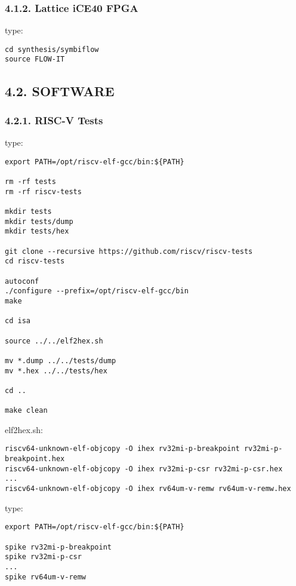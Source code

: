\documentclass[]{article}
\begin{document}
\hypertarget{lattice-ice40-fpga}{%
\subsubsection{4.1.2. Lattice iCE40 FPGA}\label{lattice-ice40-fpga}}

type:

\begin{verbatim}
cd synthesis/symbiflow
source FLOW-IT
\end{verbatim}

\hypertarget{software-1}{%
\subsection{4.2. SOFTWARE}\label{software-1}}

\hypertarget{risc-v-tests}{%
\subsubsection{4.2.1. RISC-V Tests}\label{risc-v-tests}}

type:

\begin{verbatim}
export PATH=/opt/riscv-elf-gcc/bin:${PATH}

rm -rf tests
rm -rf riscv-tests

mkdir tests
mkdir tests/dump
mkdir tests/hex

git clone --recursive https://github.com/riscv/riscv-tests
cd riscv-tests

autoconf
./configure --prefix=/opt/riscv-elf-gcc/bin
make

cd isa

source ../../elf2hex.sh

mv *.dump ../../tests/dump
mv *.hex ../../tests/hex

cd ..

make clean
\end{verbatim}

elf2hex.sh:

\begin{verbatim}
riscv64-unknown-elf-objcopy -O ihex rv32mi-p-breakpoint rv32mi-p-breakpoint.hex
riscv64-unknown-elf-objcopy -O ihex rv32mi-p-csr rv32mi-p-csr.hex
...
riscv64-unknown-elf-objcopy -O ihex rv64um-v-remw rv64um-v-remw.hex
\end{verbatim}

type:

\begin{verbatim}
export PATH=/opt/riscv-elf-gcc/bin:${PATH}

spike rv32mi-p-breakpoint
spike rv32mi-p-csr
...
spike rv64um-v-remw
\end{verbatim}
\end{document}
